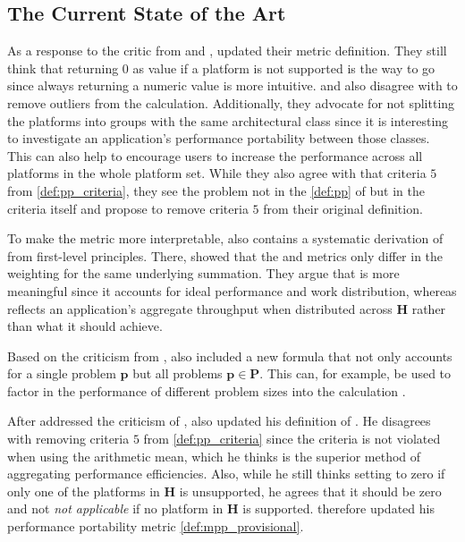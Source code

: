 \subsection{The Current State of the Art}
\label{sec:pp_sota}

As a response to the critic from \citet{yokota_beginners_2018} and \citet{marowka_toward_2021, marowka_reformulation_2022}, \citet{pennycook_revisiting_2021} updated their \pp metric definition. 
They still think that returning $0$ as \pp value if a platform is not supported is the way to go since always returning a numeric value is more intuitive. and also disagree with \cite{marowka_toward_2021, marowka_reformulation_2022} to remove outliers from the \pp calculation. 
Additionally, they advocate for not splitting the platforms into groups with the same architectural class since it is interesting to investigate an application's performance portability between those classes. 
This can also help to encourage users to increase the performance across all platforms in the whole platform set. 
While they also agree with \cite{marowka_toward_2021, marowka_reformulation_2022} that criteria $5$ from \autoref{def:pp_criteria}, they see the problem not in the \autoref{def:pp} of \pp but in the criteria itself and propose to remove criteria $5$ from their original definition. 

To make the \pp metric more interpretable, \cite{pennycook_revisiting_2021} also contains a systematic derivation of \pp from first-level principles. 
There, \citeauthor{pennycook_revisiting_2021} showed that the \pp and \mpp metrics only differ in the weighting for the same underlying summation. 
They argue that \pp is more meaningful since it accounts for ideal performance and work distribution, whereas \mpp reflects an application's aggregate throughput when distributed across $\mathbf{H}$ rather than what it should achieve. 

Based on the criticism from \citet{yokota_beginners_2018},  \citet{pennycook_revisiting_2021} also included a new \pp formula that not only accounts for a single problem $\mathbf{p}$ but all problems $\mathbf{p} \in \mathbf{P}$. 
This can, for example, be used to factor in the performance of different problem sizes into the calculation \pp.


After \citet{pennycook_revisiting_2021} addressed the criticism of \cite{marowka_toward_2021, marowka_reformulation_2022}, \cite{marowka_comparison_2023} also updated his definition of \mpp. 
He disagrees with removing criteria $5$ from \autoref{def:pp_criteria} since the criteria is not violated when using the arithmetic mean, which he thinks is the superior method of aggregating performance efficiencies. 
Also, while he still thinks setting \pp to zero if only one of the platforms in $\mathbf{H}$ is unsupported, he agrees that it should be zero and not \textit{not applicable} if no platform in $\mathbf{H}$ is supported. 
\citeauthor{marowka_comparison_2023} therefore updated his performance portability metric \autoref{def:mpp_provisional}.

